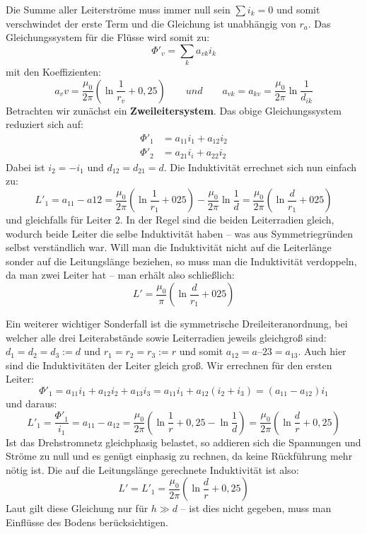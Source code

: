 \documentclass[10pt,a4paper]{article}
\begin{document}
Die Summe aller Leiterströme muss immer null sein $\sum i_k=0$ und somit verschwindet der erste Term und die Gleichung ist unabhängig von $r_a$. Das Gleichungssystem für die Flüsse wird somit zu:
\begin{equation}
\Phi'_v = \sum_k a_{vk}i_k
\end{equation}
mit den Koeffizienten:
\begin{equation}
a_vv = \frac{\mu_0}{2\pi} \left( \ln\frac{1}{r_v} + 0,25 \right) \qquad und \qquad a_{vk} = a_{kv} = \frac{\mu_0}{2\pi} \ln\frac{1}{d_{ik}}
\end{equation}
Betrachten wir zunächst ein \textbf{Zweileitersystem}. Das obige Gleichungssystem reduziert sich auf:
\begin{align}
\Phi'_1 &= a_{11}i_1 + a_{12}i_2 \\
\Phi'_2 &= a_{21}i_i + a_{22}i_2
\end{align}
Dabei ist $i_2 = -i_1$ und $d_{12} = d_{21} = d$. Die Induktivität errechnet sich nun einfach zu:
\begin{equation}
L'_1 = a_{11} - a{12} = \frac{\mu_0}{2\pi}\left(\ln\frac{1}{r_1}+025\right)-\frac{\mu_0}{2\pi}\ln\frac{1}{d} = 
\frac{\mu_0}{2\pi}\left(\ln\frac{d}{r_1}+025\right)
\end{equation}
und gleichfalls für Leiter 2. In der Regel sind die beiden Leiterradien gleich, wodurch beide Leiter die selbe Induktivität haben – was aus Symmetriegründen selbst verständlich war. Will man die Induktivität nicht auf die Leiterlänge sonder auf die Leitungslänge beziehen, so muss man die Induktivität verdoppeln, da man zwei Leiter hat – man erhält also schließlich:
\begin{equation}
L' = \frac{\mu_0}{\pi}\left(\ln\frac{d}{r_1}+025\right)
\end{equation}

Ein weiterer wichtiger Sonderfall ist die symmetrische Dreileiteranordnung, bei welcher alle drei Leiterabstände sowie Leiterradien jeweils gleichgroß sind: $d_1=d_2=d_3:=d$ und $r_1=r_2=r_3:=r$ und somit $a_{12}=a–{23}=a_{13}$. Auch hier sind die Induktivitäten der Leiter gleich groß. Wir errechnen für den ersten Leiter:
\begin{equation}
\Phi'_1 = a_{11}i_1+a_{12}i_2+a_{13}i_3 = a_{11}i_1+a_{12}\left(i_2+i_3\right) = \left(a_{11}-a_{12}\right)i_1
\end{equation}
und daraus:
\begin{equation}
L'_1 = \frac{\Phi'_1}{i_1} = a_{11}-a_{12} = \frac{\mu_0}{2\pi}\left(\ln\frac{1}{r}+0,25-\ln\frac{1}{d} \right) =
\frac{\mu_0}{2\pi}\left(\ln\frac{d}{r}+0,25 \right)
\end{equation}
Ist das Drehstromnetz gleichphasig belastet, so addieren sich die Spannungen und Ströme zu null und es genügt einphasig zu rechnen, da keine Rückführung mehr nötig ist. Die auf die Leitungslänge gerechnete Induktivität ist also:
\begin{equation}\label{Induktivitaet3}
L' = L'_1 = \frac{\mu_0}{2\pi}\left(\ln\frac{d}{r}+0,25 \right)
\end{equation}
Laut \cite{Harrison} gilt diese Gleichung nur für $h\gg d$ – ist dies nicht gegeben, muss man Einflüsse des Bodens berücksichtigen.
\end{document}
